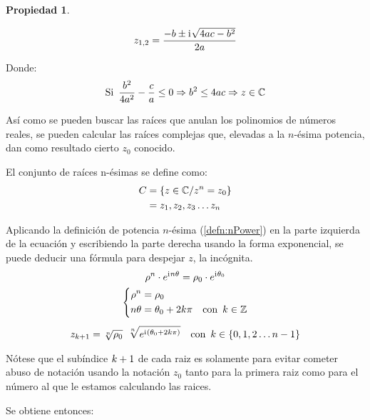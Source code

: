 \documentclass[a5paper,12pt,twoside]{book}
\newtheorem{prop}{{Propiedad}}[chapter]
\begin{document}
\begin{mdframed}[style=MyFrame1]
    \begin{prop}
    \end{prop}
    \begin{equation*}
        z_{1,2} = \frac{-b \pm \mathrm{i}\mkern1mu \sqrt{4ac-b^2}}{2a}
    \end{equation*}
\end{mdframed}

Donde:
\begin{equation*}
    \textrm{Si} \enspace \frac{b^2}{4a^2} - \frac{c}{a} \leq 0 \Rightarrow b^2 \leq 4ac \Rightarrow z \in \mathbb{C}
\end{equation*}

Así como se pueden buscar las raíces que anulan los polinomios de números reales, se pueden calcular las raíces complejas que, elevadas a la $n$-ésima potencia, dan como resultado cierto $z_0$ conocido.

El conjunto de raíces n-ésimas se define como:
\begin{align*}
    C &= { \left\{ {z \in \mathbb{C} / z^n=z_0} \right\} }
    \\
    &= z_1,z_2,z_3 \ldots z_n
\end{align*}

Aplicando la definición de potencia $n$-ésima (\ref{defn:nPower}) en la parte izquierda de la ecuación y escribiendo la parte derecha usando la forma exponencial, se puede deducir una fórmula para despejar $z$, la incógnita.
\begin{gather*}
    \rho^n \cdot e^{\mathrm{i}\mkern1mu n \theta} = \rho_0 \cdot e^{\mathrm{i}\mkern1mu \theta_0}
    \\
    \left\{
    \begin{aligned}
        \rho^n &= \rho_0
        \\
        n \theta &= \theta_0 + 2k \pi \quad \textrm{con} \enspace k \in \mathbb{Z}
    \end{aligned}
    \right.
    \\[1ex]
    z_{k+1} = \sqrt[n]{\rho_0} \enspace \sqrt[n]{e^{\mathrm{i}\mkern1mu (\theta_0 + 2 k \pi)}} \quad \textrm{con} \enspace k \in \{0,1,2 \ldots n-1\}
\end{gather*}

Nótese que el subíndice $k+1$ de cada raiz es solamente para evitar cometer abuso de notación usando la notación $z_0$ tanto para la primera raiz como para el número al que le estamos calculando las raices.

Se obtiene entonces:
\end{document}
